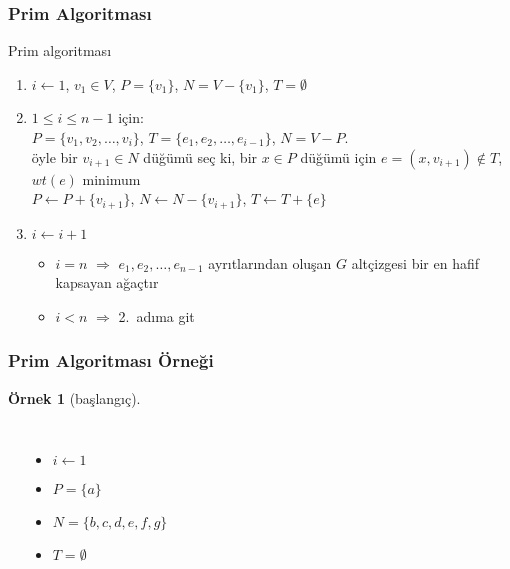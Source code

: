 \documentclass[dvipsnames]{beamer}
\theoremstyle{definition}
\theoremstyle{example}
\newtheorem{ornek}[theorem]{Örnek}
\theoremstyle{plain}
\begin{document}
\begin{frame}
  \frametitle{Prim Algoritması}

  \begin{block}{Prim algoritması}
    \begin{enumerate}
      \item $i \leftarrow 1$, $v_1 \in V$, $P=\{v_1\}$, $N=V-\{v_1\}$,
        $T=\emptyset$

      \pause
      \item $1 \leq i \leq n-1$ için:\\
        $P=\{v_1,v_2,\dots,v_i\}$, $T=\{e_1,e_2,\dots,e_{i-1}\}$, $N=V-P$.\\
        öyle bir $v_{i+1} \in N$ düğümü seç ki, bir $x \in P$ düğümü için
        $e=(x,v_{i+1}) \notin T$, $wt(e)$ minimum\\
        $P \leftarrow P+\{v_{i+1}\}$, $N \leftarrow N-\{v_{i+1}\}$,
        $T \leftarrow T+\{e\}$

      \pause
      \item $i \leftarrow i+1$
      \begin{itemize}
        \item $i=n$ $\Rightarrow$ $e_1,e_2,\dots,e_{n-1}$ ayrıtlarından oluşan
          $G$ altçizgesi bir en hafif kapsayan ağaçtır
        \item $i<n$ $\Rightarrow$ 2.~adıma git
      \end{itemize}
    \end{enumerate}
  \end{block}
\end{frame}

\begin{frame}
  \frametitle{Prim Algoritması Örneği}

  \begin{ornek}[başlangıç]
    \begin{columns}
      \begin{center}
      \end{center}

      \pause
      \begin{itemize}
        \item $i \leftarrow 1$
        \item $P = \{ a \}$
        \item $N = \{ b, c, d, e, f, g \}$
        \item $T = \emptyset$
      \end{itemize}
    \end{columns}
  \end{ornek}
\end{frame}
\end{document}
